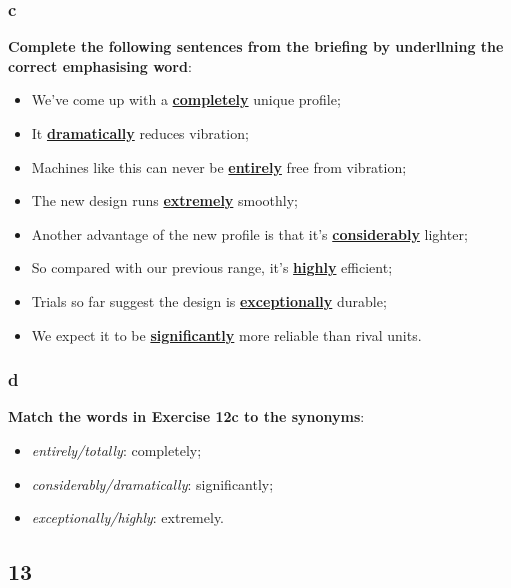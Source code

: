 \subsubsection{c}

\textbf{Complete the following sentences from the briefing by underllning the correct emphasising word}:

\begin{itemize}

\item We've come up with a \underline{\textbf{completely}} unique profile;
\item It \underline{\textbf{dramatically}} reduces vibration;
\item Machines like this can never be \underline{\textbf{entirely}} free from vibration;
\item The new design runs \underline{\textbf{extremely}} smoothly;
\item Another advantage of the new profile is that it's \underline{\textbf{considerably}} lighter;
\item So compared with our previous range, it's \underline{\textbf{highly}} efficient;
\item Trials so far suggest the design is \underline{\textbf{exceptionally}} durable;
\item We expect it to be \underline{\textbf{significantly}} more reliable than rival units.

\end{itemize}

\subsubsection{d}

\textbf{Match the words in Exercise 12c to the synonyms}:

\begin{itemize}

\item \textit{entirely/totally}: completely;
\item \textit{considerably/dramatically}: significantly;
\item \textit{exceptionally/highly}: extremely.

\end{itemize}

\subsection{13}

